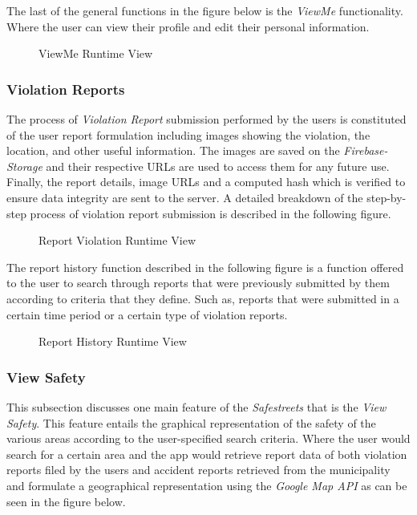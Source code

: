 The last of the general functions in the figure below is the \emph{ViewMe} functionality. Where the user can view their profile and edit their personal information.

\begin{figure}[H]
\caption{ViewMe Runtime View}
\label{fig:RuntimeProf}
\centering

\end{figure}

\subsubsection{Violation Reports}
The process of \emph{Violation Report} submission performed by the users is constituted of the user report formulation including images showing the violation, the location, and other useful information. The images are saved on the \emph{Firebase-Storage} and their respective URLs are used to access them for any future use. Finally, the report details, image URLs and a computed hash which is verified to ensure data integrity are sent to the server. A detailed breakdown of the step-by-step process of violation report submission is described in the following figure.

\begin{figure}[H]
\caption{Report Violation Runtime View}
\label{fig:RuntimeRep}
\centering

\end{figure}

The report history function described in the following figure is a function offered to the user to search through reports that were previously submitted by them according to criteria that they define. Such as, reports that were submitted in a certain time period or a certain type of violation reports.

\begin{figure}[H]
\caption{Report History Runtime View}
\label{fig:RuntimeHist}
\centering

\end{figure}

\subsubsection{View Safety}
This subsection discusses one main feature of the \emph{Safestreets} that is the \emph{View Safety}. This feature entails the graphical representation of the safety of the various areas according to the user-specified search criteria. Where the user would search for a certain area and the app would retrieve report data of both violation reports filed by the users and accident reports retrieved from the municipality and formulate a geographical representation using the \emph{Google Map API} as can be seen in the figure below.

